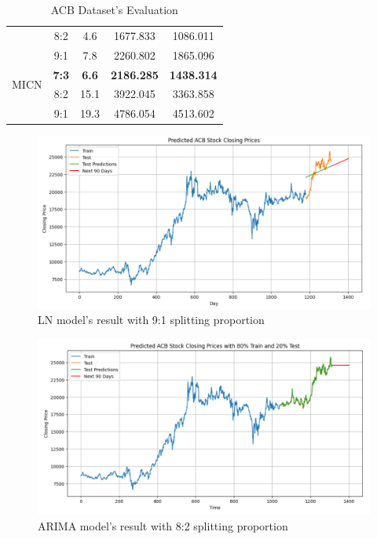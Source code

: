 \documentclass{ieeeojies}
\begin{document}
\begin{table}[H]
\begin{tabular}{|c|c|c|c|c|}
         & 8:2 & 4.6 & 1677.833 & 1086.011 \\ 
         & 9:1 & 7.8 & 2260.802 & 1865.096 \\
         \hline
         \multirow{2}{*}{MICN} & \textbf{7:3} & \textbf{6.6} & \textbf{2186.285} & \textbf{1438.314} \\ 
         & 8:2 & 15.1 & 3922.045 & 3363.858 \\ 
         & 9:1 & 19.3 & 4786.054 & 4513.602 \\
         \hline
    \end{tabular}
    \caption{ACB Dataset's Evaluation}
    \label{acbresult}
\end{table}
\begin{figure}[H]
  \centering
  \begin{minipage}{0.8\linewidth}
    \centering
    \includegraphics[width=\linewidth]{bibliography/ACB-LN-9-1.png}
    \caption{LN model's result with 9:1 splitting proportion}
    \label{fig15}
  \end{minipage}
\end{figure}
\begin{figure}[H]
  \centering
  \begin{minipage}{0.8\linewidth}
    \centering
    \includegraphics[width=\linewidth]{bibliography/ACB-ARIMA-8-2.png}
    \caption{ARIMA model's result with 8:2 splitting proportion}
    \label{fig16}
  \end{minipage}
\end{figure}
\end{document}
